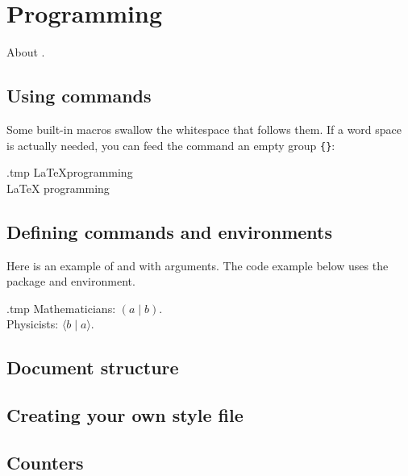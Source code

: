 \chapter{Programming}


\begin{latexthree}
About .
\end{latexthree}


\section{Using commands}

\begin{warning}
Some built-in macros swallow the whitespace that follows them.
If a word space is actually needed, you can feed the command an empty group \verb|{}|:
\begin{VerbatimOut}{\jobname.tmp}
\LaTeX programming\\
\LaTeX{} programming
\end{VerbatimOut}
\ShowExample
\end{warning}



\section{Defining commands and environments}

Here is an example of  and  with arguments.
The code example below uses the  package
and  environment.

\begin{VerbatimOut}{\jobname.tmp}
\newcommand{\dual}[2]{(#1 \mid #2)}
Mathematicians: $\dual{a}{b}$.\\
\renewcommand{\dual}[2]
  {\langle#2 \mid #1\rangle}
Physicists: $\dual{a}{b}$.
\end{VerbatimOut}
\ShowExample

\section{Document structure}



\section{Creating your own style file}

\section{Counters}

